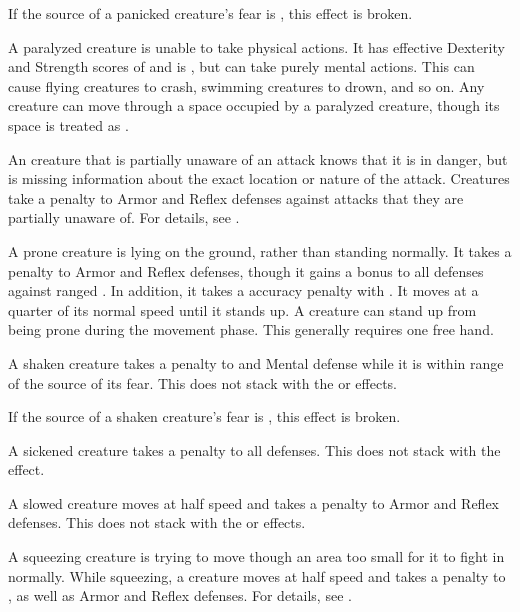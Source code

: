 If the source of a panicked creature's fear is , this effect is broken.

 A paralyzed creature is unable to take physical actions. It has effective Dexterity and Strength scores of  and is \helpless, but can take purely mental actions. This can cause flying creatures to crash, swimming creatures to drown, and so on. Any creature can move through a space occupied by a paralyzed creature, though its space is treated as .

 An creature that is partially unaware of an attack knows that it is in danger, but is missing information about the exact location or nature of the attack.
Creatures take a  penalty to Armor and Reflex defenses against attacks that they are partially unaware of.
For details, see .

 A prone creature is lying on the ground, rather than standing normally.
It takes a  penalty to Armor and Reflex defenses, though it gains a  bonus to all defenses against ranged .
In addition, it takes a  accuracy penalty with .
It moves at a quarter of its normal speed until it stands up.
A creature can stand up from being prone during the movement phase.
This generally requires one free hand.

 A shaken creature takes a  penalty to  and Mental defense while it is within \rngmed range of the source of its fear.
This does not stack with the \frightened or \panicked effects.

If the source of a shaken creature's fear is , this effect is broken.

 A sickened creature takes a  penalty to all defenses.
This does not stack with the \nauseated effect.

 A slowed creature moves at half speed and takes a  penalty to Armor and Reflex defenses.
This does not stack with the \decelerated or \immobilized effects.

 A squeezing creature is trying to move though an area too small for it to fight in normally.
While squeezing, a creature moves at half speed and takes a  penalty to , as well as Armor and Reflex defenses.
For details, see .

